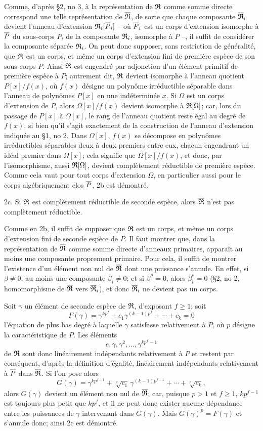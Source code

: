 Comme, d'après \S 2, no 3, à la représentation de $\mathfrak R$ comme somme directe correspond une telle représentation de $\overline{\mathfrak R}$, de sorte que chaque composante $\overline{\mathfrak R}_i$ devient l'anneau d'extension $\mathfrak R_i[\overline P_i]$ -- où $\overline P_i$ est un corps d'extension isomorphe à $\overline P$ du sous-corps $P_i$ de la composante $\mathfrak R_i$, isomorphe à $P$ --, il suffit de considérer la composante séparée $\mathfrak R_i$. On peut donc supposer, sans restriction de généralité, que $\mathfrak R$ est un corps, et même un corps d'extension fini de première espèce de son sous-corps $P$. Ainsi $\mathfrak R$ est engendré par adjonction d'un élément primitif de première espèce à $P$; autrement dit, $\mathfrak R$ devient isomorphe à l'anneau quotient $P[x]/f(x)$, où $f(x)$ désigne un polynôme irréductible séparable dans l'anneau de polynômes $P[x]$ en une indéterminée $x$. Si $\Omega$ est un corps d'extension de $P$, alors $\Omega[x]/f(x)$ devient isomorphe à $\mathfrak R[\Omega]$; car, lors du passage de $P[x]$ à $\Omega[x]$, le rang de l'anneau quotient reste égal au degré de $f(x)$, si bien qu'il s'agit exactement de la construction de l'anneau d'extension indiquée au \S 1, no 2. Dans $\Omega[x]$, $f(x)$ se décompose en polynômes irréductibles séparables deux à deux premiers entre eux, chacun engendrant un idéal premier dans $\Omega[x]$; cela signifie que $\Omega[x]/f(x)$, et donc, par l'isomorphisme, aussi $\mathfrak R[\Omega]$, devient complètement réductible de première espèce. Comme cela vaut pour tout corps d'extension $\Omega$, en particulier aussi pour le corps algébriquement clos $\overline P$, 2b est démontré.

2c. Si $\mathfrak R$ est complètement réductible de seconde espèce, alors $\overline{\mathfrak R}$ n'est pas complètement réductible.

Comme en 2b, il suffit de supposer que $\mathfrak R$ est un corps, et même un corps d'extension fini de seconde espèce de $P$. Il faut montrer que, dans la représentation de $\overline{\mathfrak R}$ comme somme directe d'anneaux primaires, apparaît au moins une composante proprement primaire. Pour cela, il suffit de montrer l'existence d'un élément non nul de $\overline{\mathfrak R}$ dont une puissance s'annule. En effet, si $\bar\beta\ne0$, au moins une composante $\bar\beta_i\ne0$; et si $\bar\beta^\rho=0$, alors $\bar\beta_i^\rho=0$ (\S 2, no 2, homomorphisme de $\overline{\mathfrak R}$ vers $\overline{\mathfrak R}_i$), et donc $\overline{\mathfrak R}_i$ ne devient pas un corps.

Soit $\gamma$ un élément de seconde espèce de $\mathfrak R$, d'exposant $f\ge 1$; soit
\[
        F(\gamma)=\gamma^{kp^f}+c_1\gamma^{(k-1)p^f}+\cdots+c_k=0
\]
l'équation de plus bas degré à laquelle $\gamma$ satisfasse relativement à $P$, où $p$ désigne la caractéristique de $P$. Les éléments
\[
        e,\gamma,\gamma^2,\ldots,\gamma^{kp^f-1}
\]
de $\mathfrak R$ sont donc linéairement indépendants relativement à $P$ et restent par conséquent, d'après la définition d'égalité, linéairement indépendants relativement à $\overline P$ dans $\overline{\mathfrak R}$. Si l'on pose alors
\[
        G(\gamma)=\gamma^{kp^{f-1}}+\sqrt[p]{c_1}\,\gamma^{(k-1)p^{f-1}}+\cdots+\sqrt[p]{c_k},
\]
alors $G(\gamma)$ devient un élément non nul de $\overline{\mathfrak R}$; car, puisque $p>1$ et $f\ge1$, $kp^{f-1}$ est toujours plus petit que $kp^f$, et il ne peut donc exister aucune dépendance entre les puissances de $\gamma$ intervenant dans $G(\gamma)$. Mais $G(\gamma)^p=F(\gamma)$ et s'annule donc; ainsi 2c est démontré.

